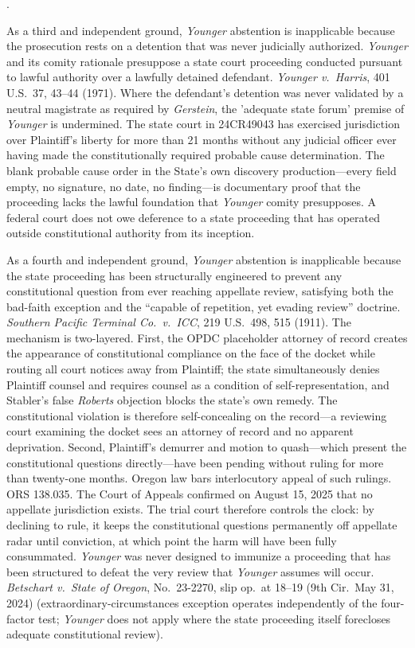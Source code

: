 \documentclass[12pt,letterpaper]{article}
\newcounter{complaintpara}
\newenvironment{paras}{%
	\begin{list}{\arabic{complaintpara}.}{%
			\setlength{\leftmargin}{0.5in}%
			\setlength{\labelwidth}{0.4in}%
			\setlength{\labelsep}{0.1in}%
			\setlength{\itemsep}{0pt}%
			\setlength{\parsep}{0pt}%
			\setlength{\topsep}{6pt}%
		}%
	}{%
	\end{list}%
}
\begin{document}
	\begin{paras}
		\item As a third and independent ground, \textit{Younger} abstention is inapplicable because the prosecution rests on a detention that was never judicially authorized. \textit{Younger} and its comity rationale presuppose a state court proceeding conducted pursuant to lawful authority over a lawfully detained defendant. \textit{Younger v.\ Harris}, 401 U.S.\ 37, 43--44 (1971). Where the defendant's detention was never validated by a neutral magistrate as required by \textit{Gerstein}, the 'adequate state forum' premise of \textit{Younger} is undermined. The state court in 24CR49043 has exercised jurisdiction over Plaintiff's liberty for more than 21 months without any judicial officer ever having made the constitutionally required probable cause determination. The blank probable cause order in the State's own discovery production---every field empty, no signature, no date, no finding---is documentary proof that the proceeding lacks the lawful foundation that \textit{Younger} comity presupposes. A federal court does not owe deference to a state proceeding that has operated outside constitutional authority from its inception.
		\item As a fourth and independent ground, \textit{Younger} abstention is inapplicable because the state proceeding has been structurally engineered to prevent any constitutional question from ever reaching appellate review, satisfying both the bad-faith exception and the ``capable of repetition, yet evading review'' doctrine. \textit{Southern Pacific Terminal Co.\ v.\ ICC}, 219 U.S.\ 498, 515 (1911). The mechanism is two-layered. First, the OPDC placeholder attorney of record creates the appearance of constitutional compliance on the face of the docket while routing all court notices away from Plaintiff; the state simultaneously denies Plaintiff counsel and requires counsel as a condition of self-representation, and Stabler's false \textit{Roberts} objection blocks the state's own remedy. The constitutional violation is therefore self-concealing on the record---a reviewing court examining the docket sees an attorney of record and no apparent deprivation. Second, Plaintiff's demurrer and motion to quash---which present the constitutional questions directly---have been pending without ruling for more than twenty-one months. Oregon law bars interlocutory appeal of such rulings. ORS 138.035. The Court of Appeals confirmed on August 15, 2025 that no appellate jurisdiction exists. The trial court therefore controls the clock: by declining to rule, it keeps the constitutional questions permanently off appellate radar until conviction, at which point the harm will have been fully consummated. \textit{Younger} was never designed to immunize a proceeding that has been structured to defeat the very review that \textit{Younger} assumes will occur. \textit{Betschart v.\ State of Oregon}, No.\ 23-2270, slip op.\ at 18--19 (9th Cir.\ May 31, 2024) (extraordinary-circumstances exception operates independently of the four-factor test; \textit{Younger} does not apply where the state proceeding itself forecloses adequate constitutional review).
		

\end{paras}
\end{document}
